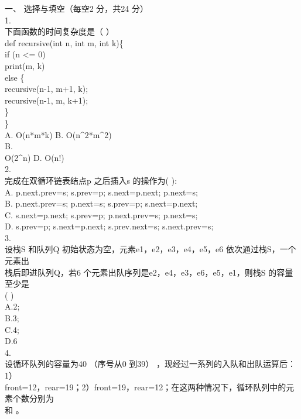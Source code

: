 
\begin{question}
一、 选择与填空（每空2 分，共24 分）\\
1.\\
下面函数的时间复杂度是（    ）\\
def recursive(int n, int m, int k)\{\\
if (n <= 0)\\
print(m, k)\\
else \{\\
recursive(n-1, m+1, k);\\
recursive(n-1, m, k+1);\\
\}\\
\}\\
A. O(n*m*k)        B. O(n\textasciicircum{}2*m\textasciicircum{}2)\\
B.\\
O(2\textasciicircum{}n)           D. O(n!)\\
2.\\
完成在双循环链表结点p 之后插入s 的操作为(       ):\\
A. p.next.prev=s; s.prev=p; s.next=p.next; p.next=s;\\
B. p.next.prev=s; p.next=s; s.prev=p; s.next=p.next;\\
C. s.next=p.next; s.prev=p; p.next.prev=s; p.next=s;\\
D. s.prev=p; s.next=p.next; s.prev.next=s; s.next.prev=s;\\
3.\\
设栈S 和队列Q 初始状态为空，元素e1，e2，e3，e4，e5，e6 依次通过栈S，一个元素出\\
栈后即进队列Q，若6 个元素出队序列是e2，e4，e3，e6，e5，e1，则栈S 的容量至少是\\
(       )\\
A.2;\\
B.3;\\
C.4;\\
D.6\\
4.\\
设循环队列的容量为40 （序号从0 到39） ，现经过一系列的入队和出队运算后： 1）\\
front=12，rear=19；2）front=19，rear=12；在这两种情况下，循环队列中的元素个数分别为\\
和        。\\

\end{question}
